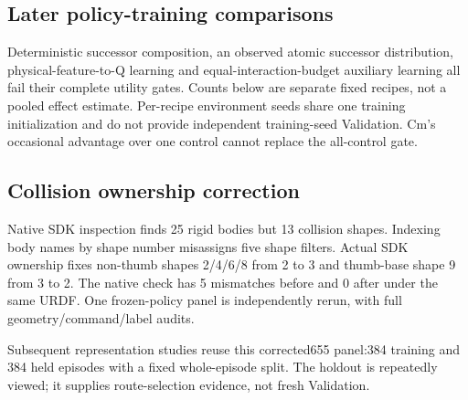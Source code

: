 \documentclass[10pt]{article}
\begin{document}
\subsection{Later policy-training comparisons}
Deterministic successor composition, an observed atomic successor distribution,
physical-feature-to-Q learning and equal-interaction-budget auxiliary learning
all fail their complete utility gates. Counts below are separate fixed recipes,
not a pooled effect estimate. Per-recipe environment seeds share one training
initialization and do not provide independent training-seed Validation. Cm's
occasional advantage over one control cannot replace the all-control gate.
\begin{table}[ht]\centering\small

\caption{Later trained-policy physical105 counts, each arm /384; legacy physics.
The task-Q column in the last two rows uses different declared budgets.}
\end{table}
\subsection{Collision ownership correction}
Native SDK inspection finds 25 rigid bodies but 13 collision shapes. Indexing body
names by shape number misassigns five shape filters. Actual SDK ownership fixes
non-thumb shapes 2/4/6/8 from 2 to 3 and thumb-base shape 9 from 3 to 2. The native
check has 5 mismatches before and 0 after under the same URDF. One frozen-policy
panel is independently rerun, with full geometry/command/label audits.
\begin{table}[ht]\centering

\caption{Fixed-policy sensitivity to corrected collision ownership. One seed,
no retraining, no exact paired solver states. PROMISING refers to sensitivity,
not Cm utility or performance improvement. All motion 0 counts remain zero.}
\end{table}
Subsequent representation studies reuse this corrected655 panel:384 training and
384 held episodes with a fixed whole-episode split. The holdout is repeatedly
viewed; it supplies route-selection evidence, not fresh Validation.

\clearpage
\end{document}
